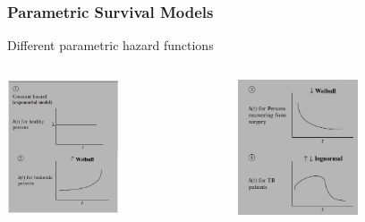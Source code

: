 \documentclass{beamer}
\theoremstyle{definition}
\begin{document}
\begin{frame}
\frametitle{Parametric Survival Models}
\begin{block}{Different parametric hazard functions}
\begin{columns}
    \begin{column}{0.48\textwidth}
        \includegraphics[width =\textwidth, height=4cm]{hazardsplots1.JPG}
    \end{column}
    \hspace{-10pt}
    \begin{column}{0.48\textwidth}
         \includegraphics[width =\textwidth, height=4cm]{hazardplots2.JPG}
    \end{column}
\end{columns}
\end{block}
\end{frame}
\end{document}
